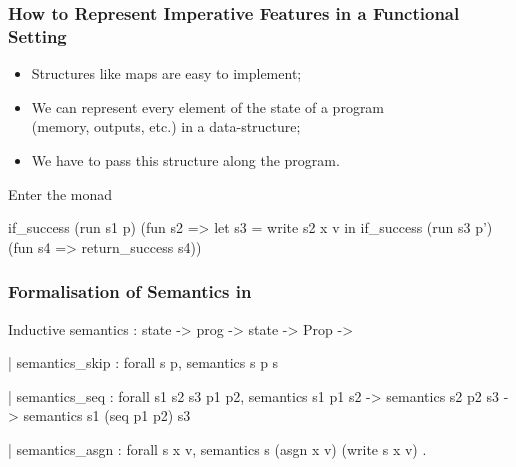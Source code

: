\documentclass{beamer}
\begin{document}
\begin{frame}[fragile]
    \label{frame:imperative:functional}
    \frametitle{How to Represent Imperative Features in a Functional Setting}

    \begin{itemize}
        \item Structures like maps are easy to implement;
        \item We can represent every element of the state of a program \\
            (memory, outputs, etc.) in a data-structure;
        \item We have to pass this structure along the program.
    \end{itemize}

    \begin{block}{Enter the monad}
\begin{camlcode}
if_success (run s1 p) (fun s2 =>
  let s3 = write s2 x v in
  if_success (run s3 p') (fun s4 =>
    return_success s4))
\end{camlcode}
    \end{block}

\end{frame}

\frame{\questiontoc}

\begin{frame}[fragile]
    \label{frame:semantics:coq}
    \frametitle{Formalisation of Semantics in \coqn{}}

\begin{coqcode}
Inductive semantics : state -> prog -> state -> Prop ->

  | semantics_skip : forall s p, semantics s p s

  | semantics_seq : forall s1 s2 s3 p1 p2,
    semantics s1 p1 s2 ->
    semantics s2 p2 s3 ->
    semantics s1 (seq p1 p2) s3

  | semantics_asgn : forall s x v,
    semantics s (asgn x v) (write s x v)
  .
\end{coqcode}

\end{frame}
\end{document}
